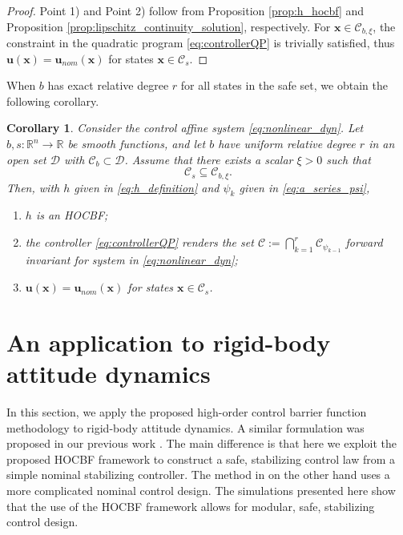 \documentclass[letterpaper, 10 pt, journal, twoside]{IEEEtran}
\theoremstyle{plain}
\newtheorem{cor}{Corollary}
\newcommand{\myvar}[1]{\bm{#1}}
\newcommand{\myset}[1]{\mathscr{#1}}
\begin{document}
\begin{proof}
      Point 1) and Point 2) follow from Proposition \ref{prop:h_hocbf} and Proposition \ref{prop:lipschitz_continuity_solution}, respectively. For $\myvar{x}\in  \myset{C}_{b,\xi}$, the constraint in the quadratic program \eqref{eq:controllerQP} is trivially satisfied, thus $\myvar{u}(\myvar{x}) = \myvar{u}_{nom}(\myvar{x})$ for states $\myvar{x}\in  \myset{C}_{s}$.
\end{proof}

When  $b$ has exact relative degree $r$ for all states in the safe set, we obtain the following corollary.
\begin{cor}
Consider the control affine system \eqref{eq:nonlinear_dyn}. Let $b,s: \mathbb{R}^n \to \mathbb{R}$ be smooth functions, and let $b$  have uniform relative degree $r$ in an open set $\myset{D}$ with $\myset{C}_b \subset \myset{D}$. Assume that there exists a scalar $\xi > 0$ such that  
\begin{equation}
    \myset{C}_s \subseteq \myset{C}_{b,\xi}.
\end{equation}
Then,   with $h$ given in \eqref{eq:h_definition} and $\psi_{k}$ given in \eqref{eq:a_series_psi},
 \begin{enumerate}
     \item  $h$ is an HOCBF;
     \item  the controller \eqref{eq:controllerQP} renders the set $\myset{C}:= \bigcap_{k =1}^{r}  \myset{C}_{\psi_{k-1}} $ forward invariant for system in \eqref{eq:nonlinear_dyn};
     \item  $\myvar{u}(\myvar{x}) = \myvar{u}_{nom}(\myvar{x})$ for states $\myvar{x}\in \myset{C}_{s}$.
 \end{enumerate}

\end{cor}



    

\section{An application to rigid-body attitude dynamics}
In this section, we apply the {proposed} high-order control barrier function {methodology} to rigid-body attitude dynamics.  A similar formulation  was proposed in our previous work \cite{tan2020construction}. The main difference is that here we exploit the proposed HOCBF framework to construct a safe, stabilizing control law from a simple nominal stabilizing controller. The method in \cite{tan2020construction} on the other hand uses a more complicated nominal control design. The simulations presented here show that the use of the HOCBF framework allows for modular, safe, stabilizing control design.
\end{document}
